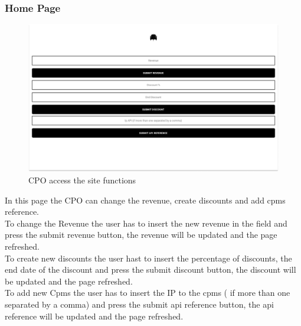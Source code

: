 \subsubsection{Home Page}
\begin{figure}[H]
    \centering
    \includegraphics[keepaspectratio, width=15cm]{SiteInterface/Homepage.png}
    \caption{\ac{CPO} access the site functions}
    \label{site:Homepage}
\end{figure}
In this page the \ac{CPO} can change the revenue, create discounts and add cpms reference.\\
To change the Revenue the user has to insert the new revenue in the field and press the submit revenue button, the revenue will be updated and the page refreshed.\\
To create new discounts the user hast to insert the percentage of discounts, the end date of the discount and press the submit discount button, the discount will be updated and the page refreshed.\\
To add new Cpms the user has to insert the IP to the cpms ( if more than one separated by a comma) and press the submit api reference button, the api reference will be updated and the page refreshed.\\


\clearpage